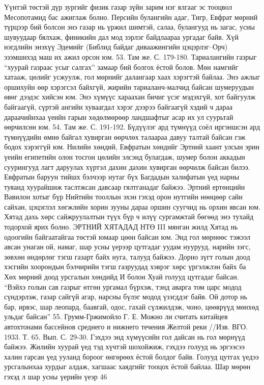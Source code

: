 Үүнтэй төстэй дүр зургийг физик газар зүйн зарим нэг ялгааг эс тооцвол Месопотамид бас ажиглаж болно. Персийн булангийн адаг, Тигр, Евфрат мөрний түрцээр бий болсон энэ газар нь үржил шимтэй, салаа, булангууд нь загас, усны шувуудаар бялхаж, финикийн дал мод зэрлэг байдлаараа ургадаг байв. Хүй нэгдлийн энэхүү Эдемийг (Библид байдаг диваажингийн цэцэрлэг–Орч) эзэмшихэд маш их ажил орсон юм. 53. Там же. С. 179-180.
Тариалангийн газрыг “хуурай газраас усыг салгах” замаар бий болгох ёстой болов. Мөн намгийг хатааж, цөлийг усжуулж, гол мөрнийг далангаар хаах хэрэгтэй байлаа. Энэ ажлыг оршихуйн өөр хэрэгсэл байхгүй, жирийн тариаланч-малчид байсан шумеруудын өвөг дээдэс хийсэн юм. Энэ хүмүүс хараахан бичиг үсэг мэдэхгүй, хот байгуулж байгаагүй, сүртэй ангийн хуваагдал хэрэг дээрээ байгаагүй хэдий ч дараа дараачийнхаа үеийн гарын хөдөлмөрөөр ландшафтыг асар их ул суурьтай өөрчилсөн юм. 54. Там же. С. 191-192.
Бүдүүлэг ард түмнүүд соёл иргэншсэн ард түмнүүдийн өмнө байгал хувирган өөрчлөх талаараа давуу талтай байсан гэж бодох хэрэггүй юм. Нилийн хөндий, Евфратын хөндийг Эртний хаант улсын эрин үеийн египетийн олон тосгон цөлийн элсэнд булагдаж, шумер болон аккадын суурингууд лагт даруулах хүртэл дахин дахин хувирган өөрчилж байсан билээ. Евфратын баруун тийшх бэлчээр нутаг бүх Багдадын халифатын үед нарны туяанд хуурайшиж таслтжсан давсаар гялтганадаг байжээ. Эртний ертөнцийн Вавилон хотыг бүр Нийтийн тооллын эхэн гэхэд орон нутгийн нөөцөөр сайн сайхан, цэцэглэл хөгжлийн хорин зууны дараа оршин суугчид нь орхин явсан юм. Хятад дахь хөрс сайжруулалтын түүх бүр ч илүү сургамжтай бөгөөд энэ тухайд тодорхой ярих болно.
ЭРТНИЙ ХЯТАДАД
НТӨ III мянган жилд Хятад нь одоогийн байгаатайгаа төстэй юмаар цөөн байсан юм. Энд гол мөрнөөс тэжээл авсан унаган ой, намаг, шар усны үерээр цутгадаг уудам нуурууд, нарийн зэгс, зөвхөн өндөрлөг тэгш газарт байх нуга, талууд байжээ.
Дорно зүгт голын доод хэсгийн хоорондын бэлчирийн тэгш газруудад хэврэг хөрс үргэлжлэн байх ба Хөх мөрний доод урсгалын хөндийд И болон Хуай голууд цутгадаг байсан. “Вэйхэ голын сав газрыг өтгөн ургамал бүрхэж, тэнд аварга том царс модод сүндэрлэж, газар сайгүй агар, нарсны бүлэг модод үзэгддэг байв. Ой дотор нь бар, ирвэс, шар леопард, баавгай, одос, гахай сүлжилдэж, чоно, цөөврүүд мөнхөд ульдаг байсан” 55. Грумм-Гржимойло Г. Е. Можно ли считать китайцев автохтонами бассейнов среднего и нижнего течения Желтой реки //Изв. ВГО. 1933. Т. 65. Вып. С. 29-30.
Гэхдээ энд хүмүүсийн гол дайсан нь гол мөрнүүд байжээ. Жилийн хуурай үед тэд хүчтэй шохойжиж, гэхдээ голууд нь эргээсээ халин гарсан үед ууланд бороог өнгөрөөх ёстой болдог байв. Голууд цутгах үедээ урсгалынхаа хурдыг алдаж, хагшаас хаядгийг тооцох ёстой байлаа. Шар мөрөн гэхэд л шар усны үерийн үеэр 46 %
